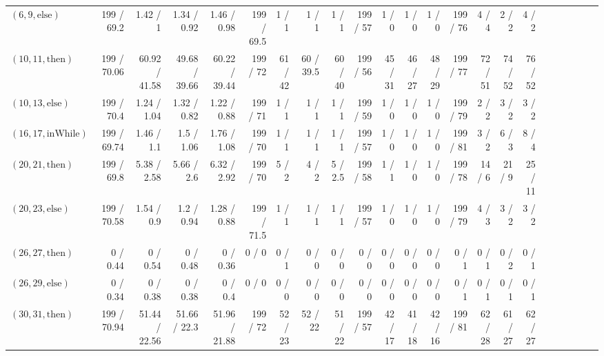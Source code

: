 \documentclass[sigconf]{acmart}
\newcommand{\thenBr}{\text{then}}
\newcommand{\elseBr}{\text{else}}
\newcommand{\inWhile}{\text{inWhile}}
\begin{document}
\begin{table*}
{\begin{tabular}{l|rrrr|rrrr|rrrr|rrrr|r|r|r|r|r|r}
    $(6,9,\elseBr)$      & 199    / 69.2    & 1.42   / 1     & 1.34   / 0.92  & 1.46   / 0.98  & 199  / 69.5 & 1   / 1  & 1   / 1     & 1   / 1    & 199  / 57  & 1   / 0   & 1   / 0  & 1   / 0   & 199  / 76  & 4   / 4   & 2   / 2   & 4   / 2   & & & & & & \\
    $(10,11,\thenBr)$    & 199    / 70.06   & 60.92  / 41.58 & 49.68  / 39.66 & 60.22  / 39.44 & 199  / 72   & 61  / 42 & 60  / 39.5  & 60  / 40   & 199  / 56  & 45  / 31  & 46  / 27 & 48  / 29  & 199  / 77  & 72  / 51  & 74  / 52  & 76  / 52  & & & & & & \\
    $(10,13,\elseBr)$    & 199    / 70.4    & 1.24   / 1.04  & 1.32   / 0.82  & 1.22   / 0.88  & 199  / 71   & 1   / 1  & 1   / 1     & 1   / 1    & 199  / 59  & 1   / 0   & 1   / 0  & 1   / 0   & 199  / 79  & 2   / 2   & 3   / 2   & 3   / 2   & & & & & & \\
    $(16,17,\inWhile)$   & 199    / 69.74   & 1.46   / 1.1   & 1.5    / 1.06  & 1.76   / 1.08  & 199  / 70   & 1   / 1  & 1   / 1     & 1   / 1    & 199  / 57  & 1   / 0   & 1   / 0  & 1   / 0   & 199  / 81  & 3   / 2   & 6   / 3   & 8   / 4   & & & & & & \\
    $(20,21,\thenBr)$    & 199    / 69.8    & 5.38   / 2.58  & 5.66   / 2.6   & 6.32   / 2.92  & 199  / 70   & 5   / 2  & 4   / 2     & 5   / 2.5  & 199  / 58  & 1   / 1   & 1   / 0  & 1   / 0   & 199  / 78  & 14  / 6   & 21  / 9   & 25  / 11  & & & & & & \\
    $(20,23,\elseBr)$    & 199    / 70.58   & 1.54   / 0.9   & 1.2    / 0.94  & 1.28   / 0.88  & 199  / 71.5 & 1   / 1  & 1   / 1     & 1   / 1    & 199  / 57  & 1   / 0   & 1   / 0  & 1   / 0   & 199  / 79  & 4   / 3   & 3   / 2   & 3   / 2   & & & & & & \\
    $(26,27,\thenBr)$    & 0      / 0.44    & 0      / 0.54  & 0      / 0.48  & 0      / 0.36  & 0    / 0    & 0   / 1  & 0   / 0     & 0   / 0    & 0    / 0   & 0   / 0   & 0   / 0  & 0   / 0   & 0    / 1   & 0   / 1   & 0   / 2   & 0   / 1   & & & & & & \\
    $(26,29,\elseBr)$    & 0      / 0.34    & 0      / 0.38  & 0      / 0.38  & 0      / 0.4   & 0    / 0    & 0   / 0  & 0   / 0     & 0   / 0    & 0    / 0   & 0   / 0   & 0   / 0  & 0   / 0   & 0    / 1   & 0   / 1   & 0   / 1   & 0   / 1   & & & & & & \\
    $(30,31,\thenBr)$    & 199    / 70.94   & 51.44  / 22.56 & 51.66  / 22.3  & 51.96  / 21.88 & 199  / 72   & 52  / 23 & 52  / 22    & 51  / 22   & 199  / 57  & 42  / 17  & 41  / 18 & 42  / 16  & 199  / 81  & 62  / 28  & 61  / 27  & 62  / 27  & & & & & & \\

\end{tabular}}
\end{table*}
\end{document}
